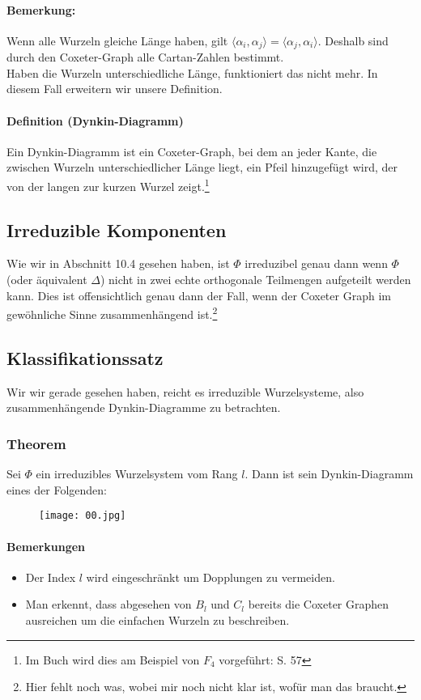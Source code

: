 \documentclass[a4paper,12pt]{article}
\begin{document}
\paragraph{Bemerkung:}
Wenn alle Wurzeln gleiche Länge haben, gilt $\langle \alpha_i, \alpha_j\rangle = \langle \alpha_j, \alpha_i\rangle$. Deshalb sind durch den Coxeter-Graph alle Cartan-Zahlen bestimmt.\\
Haben die Wurzeln unterschiedliche Länge, funktioniert das nicht mehr. In diesem Fall erweitern wir unsere Definition.
\paragraph{Definition (Dynkin-Diagramm)}
Ein Dynkin-Diagramm ist ein Coxeter-Graph, bei dem an jeder Kante, die zwischen Wurzeln unterschiedlicher Länge liegt, ein Pfeil hinzugefügt wird, der von der langen zur kurzen Wurzel zeigt.\footnote{Im Buch wird dies am Beispiel von $F_4$ vorgeführt: S. 57}

\subsection{Irreduzible Komponenten}
Wie wir in Abschnitt 10.4 gesehen haben, ist $\Phi$ irreduzibel genau dann wenn $\Phi$ (oder äquivalent $\Delta$) nicht in zwei echte orthogonale Teilmengen aufgeteilt werden kann. Dies ist offensichtlich genau dann der Fall, wenn der Coxeter Graph im gewöhnliche Sinne zusammenhängend ist.\footnote{Hier fehlt noch was, wobei mir noch nicht klar ist, wofür man das braucht.}

\subsection{Klassifikationssatz}
Wir wir gerade gesehen haben, reicht es irreduzible Wurzelsysteme, also zusammenhängende Dynkin-Diagramme zu betrachten.

\subsubsection*{Theorem}
Sei $\Phi$ ein irreduzibles Wurzelsystem vom Rang $l$. Dann ist sein Dynkin-Diagramm eines der Folgenden:

\begin{figure}[H]
\centering
\texttt{[image: 00.jpg]}
\end{figure}

\paragraph{Bemerkungen}
\begin{itemize}
\item Der Index $l$ wird eingeschränkt um Dopplungen zu vermeiden.
\item Man erkennt, dass abgesehen von $B_l$ und $C_l$ bereits die Coxeter Graphen ausreichen um die einfachen Wurzeln zu beschreiben.
\end{itemize}
\end{document}
